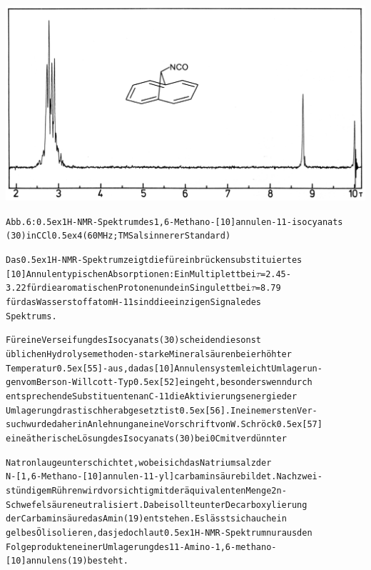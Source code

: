 \documentclass[a4paper,11pt]{article}
\begin{document}
\hspace*{-0.25cm}\includegraphics[width=14.216cm]{NMR_006}
\begin{alltt}
Abb. 6: \raise0.5ex\hbox{1}H-NMR-Spektrum des 1,6-Methano-[10]annulen-11-isocyanats
(30) in CCl\lower0.5ex\hbox{4} (60 MHz; TMS als innerer Standard)

Das \raise0.5ex\hbox{1}H-NMR-Spektrum zeigt die für ein brückensubstituiertes
[10]Annulen typischen Absorptionen: Ein Multiplett bei \(\tau\) = 2.45 -
3.22 für die aromatischen Protonen und ein Singulett bei \(\tau\) = 8.79
für das Wasserstoffatom H-11 sind die einzigen Signale des
Spektrums.

Für eine Verseifung des Isocyanats (30) scheiden die sonst
üblichen Hydrolysemethoden - starke Mineralsäuren bei erhöhter
Temperatur \raise0.5ex\hbox{[55]} - aus, da das [10]Annulensystem leicht Umlagerun-
gen vom Berson-Willcott-Typ \raise0.5ex\hbox{[52]} eingeht, besonders wenn durch
entsprechende Substituenten an C-11 die Aktivierungsenergie der
Umlagerung drastisch herabgesetzt ist \raise0.5ex\hbox{[56]}. In einem ersten Ver-
such wurde daher in Anlehnung an eine Vorschrift von W. Schröck \raise0.5ex\hbox{[57]}
eine ätherische Lösung des Isocyanats (30) bei 0\degree{}C mit verdünnter
\newpage
{}


Natronlauge unterschichtet, wobei sich das Natriumsalz der
N-[1,6-Methano-[10]annulen-11-yl]carbaminsäure bildet. Nach zwei-
stündigem Rühren wird vorsichtig mit der äquivalenten Menge 2n -
Schwefelsäure neutralisiert. Dabei sollte unter Decarboxylierung
der Carbaminsäure das Amin (19) entstehen. Es lässt sich auch ein
gelbes Öl isolieren, das jedoch laut \raise0.5ex\hbox{1}H-NMR-Spektrum nur aus den
Folgeprodukten einer Umlagerung des 11-Amino-1,6-methano-
[10]annulens (19) besteht.

\end{alltt}
\end{document}
